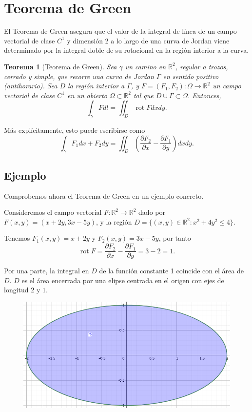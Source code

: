 \documentclass[12pt,spanish]{article}
\newtheorem{theorem}{Teorema}[section]
\theoremstyle{definition}
\theoremstyle{remark}
\begin{document}
\section{Teorema de Green}

El Teorema de Green asegura que el valor de la integral de línea de un campo vectorial de clase $C^1$ y dimensión 2 a lo largo de una curva de Jordan viene determinado por la integral doble de su rotacional en la región interior a la curva. 

\begin{theorem}[Teorema de Green]
	Sea $\gamma$ un camino en $\mathbb{R}^2$, regular a trozos, cerrado y simple, que recorre una curva de Jordan $\Gamma$ en sentido positivo (antihorario). Sea $D$ la región interior a $\Gamma$, y $F=(F_1,F_2):\Omega\rightarrow\mathbb{R}^2$ un campo vectorial de clase $C^1$ en un abierto $\Omega\subset\mathbb{R}^2$ tal que $D\cup\Gamma\subset\Omega$. Entonces,
	\[\int_\gamma F dl = \iint_D \operatorname{rot}F dx dy.\]
\end{theorem}

Más explícitamente, esto puede escribirse como
\[\int_\gamma F_1 dx+F_2 dy=\iint_D \left(\frac{\partial F_2}{\partial x}-\frac{\partial F_1}{\partial y}\right) dx dy.\]

\subsection*{Ejemplo}

Comprobemos ahora el Teorema de Green en un ejemplo concreto.

Consideremos el campo vectorial $F:\mathbb{R}^2\rightarrow\mathbb{R}^2$ dado por $F(x,y)=(x+2y,3x-5y)$, y la región $D=\{(x,y)\in\mathbb{R}^2: x^2+4y^2\leq 4\}$.

Tenemos $F_1(x,y)=x+2y$ y $F_2(x,y)=3x-5y$, por tanto
\[\operatorname{rot}F=\frac{\partial F_2}{\partial x}-\frac{\partial F_1}{\partial y}=3-2=1.\]

Por una parte, la integral en $D$ de la función constante 1 coincide con el área de $D$. $D$ es el área encerrada por una elipse centrada en el origen con ejes de longitud $2$ y $1$.

\begin{figure}[H]
	\centering
	\includegraphics[width=120mm]{images/region-ejemplo-green}
\end{figure}
\end{document}

